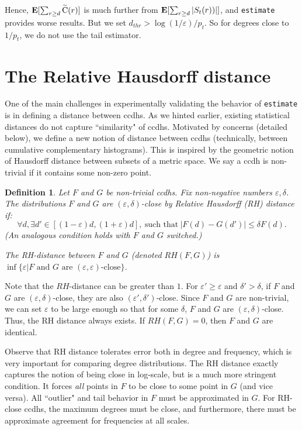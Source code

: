 \documentclass[11pt]{article}
\newtheorem{definition}{Definition}
\theoremstyle{definition}
\newcommand{\EX}{\hbox{\bf E}}
\def\eps{\varepsilon}
\newcommand{\tC}{\widetilde{\hbox{C}}}
\newcommand{\est}{{\tt estimate}}
\begin{document}
Hence, $\EX[\sum_{r \geq d}\tC(r)]$ is much further from $\EX[\sum_{r \geq d}|S_t(r))|]$,
and \est{} provides worse results. But we set $d_{thr} > \log(1/\eps)/p_t$. So for degrees
close to $1/p_t$, we do not use the tail estimator.

\section{The Relative Hausdorff distance} \label{sec:rh}

One of the main challenges in experimentally validating the behavior of \est{} is
in defining a distance between ccdhs. As we hinted earlier, existing statistical distances
do not capture ``similarity" of ccdhs.
Motivated by concerns (detailed below), we define a new notion of distance between ccdhs (technically,
between cumulative complementary histograms).
This is inspired by the geometric notion of Hausdorff distance between subsets of a metric space.
We say a ccdh is non-trivial
if it contains some non-zero point.

\begin{definition} \label{def:hauss} Let $F$ and $G$ be non-trivial ccdhs. Fix non-negative numbers $\eps, \delta$.
The distributions $F$ and $G$ are \emph{$(\eps,\delta)$-close by Relative Hausdorff (RH) distance} if:
$$ \forall d, \exists d' \in [(1-\eps)d, (1+\eps)d], \ \textrm{such that} \ |F(d) - G(d')| \leq \delta F(d).$$
(An analogous condition holds with $F$ and $G$ switched.)

The \emph{RH}-distance between $F$ and $G$ (denoted $RH(F,G)$) is  $\inf\{\eps | \textrm{$F$ and $G$ are $(\eps,\eps)$-close}\}$.
\end{definition}

Note that the $RH$-distance can be greater than $1$.
For $\eps' \geq \eps$ and $\delta' > \delta$, if $F$ and $G$ are $(\eps,\delta)$-close,
they are also $(\eps',\delta')$-close. Since $F$ and $G$ are non-trivial, we can set $\eps$ to be large enough so
that for some $\delta$, $F$ and $G$ are $(\eps,\delta)$-close. Thus, the RH distance always exists.
If $RH(F,G) = 0$, then $F$ and $G$ are identical.

Observe that RH distance tolerates error both in degree and frequency, which is very important for
comparing degree distributions.
The RH distance exactly captures the notion of being close in log-scale, but is a much more stringent condition.
It forces \emph{all} points in $F$ to be close to some point in $G$ (and vice versa).
All ``outlier" and tail behavior in $F$ must be approximated in $G$. For RH-close ccdhs, the maximum degrees
must be close, and furthermore, there must be approximate agreement for frequencies at all scales.
\end{document}
